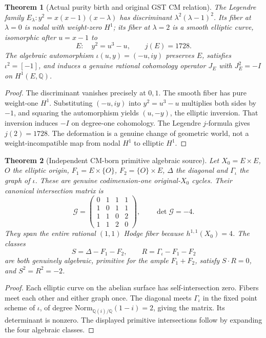 \documentclass[11pt]{article}
\newtheorem{theorem}{Theorem}
\newcommand{\Q}{\mathbb Q}
\begin{document}
\begin{theorem}[Actual purity birth and original GST CM relation]
The Legendre family \(E_\lambda:y^2=x(x-1)(x-\lambda)\) has discriminant \(\lambda^2(\lambda-1)^2\). Its fiber at \(\lambda=0\) is nodal with weight-zero \(H^1\); its fiber at \(\lambda=2\) is a smooth elliptic curve, isomorphic after \(u=x-1\) to
\[
 E:\quad y^2=u^3-u,\qquad j(E)=1728.
\]
The algebraic automorphism \(\iota(u,y)=(-u,iy)\) preserves \(E\), satisfies \(\iota^2=[-1]\), and induces a genuine rational cohomology operator \(J_E\) with \(J_E^2=-I\) on \(H^1(E,\Q)\).
\end{theorem}
\begin{proof}
The discriminant vanishes precisely at \(0,1\). The smooth fiber has pure weight-one \(H^1\). Substituting \((-u,iy)\) into \(y^2=u^3-u\) multiplies both sides by \(-1\), and squaring the automorphism yields \((u,-y)\), the elliptic inversion. That inversion induces \(-I\) on degree-one cohomology. The Legendre \(j\)-formula gives \(j(2)=1728\). The deformation is a genuine change of geometric world, not a weight-incompatible map from nodal \(H^1\) to elliptic \(H^1\).
\end{proof}

\begin{theorem}[Independent CM-born primitive algebraic source]
Let \(X_0=E\times E\), \(O\) the elliptic origin, \(F_1=E\times\{O\}\), \(F_2=\{O\}\times E\), \(\Delta\) the diagonal and \(\Gamma_\iota\) the graph of \(\iota\). These are genuine codimension-one original-\(X_0\) cycles. Their canonical intersection matrix is
\[
\mathcal G=\begin{pmatrix}
0&1&1&1\\1&0&1&1\\1&1&0&2\\1&1&2&0
\end{pmatrix},\qquad \det\mathcal G=-4.
\]
They span the entire rational \((1,1)\) Hodge fiber because \(h^{1,1}(X_0)=4\). The classes
\[
 S=\Delta-F_1-F_2,\qquad R=\Gamma_\iota-F_1-F_2
\]
are both genuinely algebraic, primitive for the ample \(F_1+F_2\), satisfy \(S\cdot R=0\), and \(S^2=R^2=-2\).
\end{theorem}
\begin{proof}
Each elliptic curve on the abelian surface has self-intersection zero. Fibers meet each other and either graph once. The diagonal meets \(\Gamma_\iota\) in the fixed point scheme of \(\iota\), of degree \(\mathrm{Norm}_{\Q(i)/\Q}(1-i)=2\), giving the matrix. Its determinant is nonzero. The displayed primitive intersections follow by expanding the four algebraic classes.
\end{proof}
\end{document}
